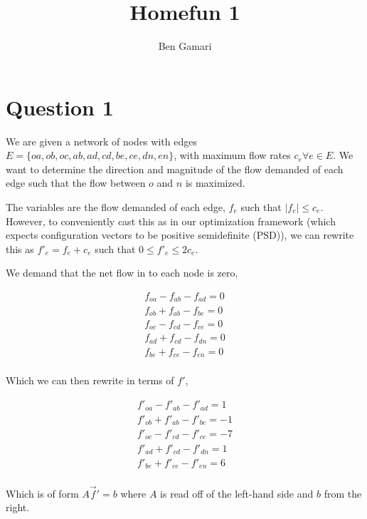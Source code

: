 \documentclass{article}
\title{Homefun 1}
\author{Ben Gamari}
\begin{document}
\maketitle

\section{Question 1}

We are given a network of nodes with edges $E = \{ oa, ob, oc, ab, ad, cd,
be, ce, dn, en \}$, with maximum flow rates $c_e \forall e \in E$. We want
to determine the direction and magnitude of the flow demanded of each
edge such that the flow between $o$ and $n$ is maximized.

The variables are the flow demanded of each edge, $f_e$ such that
$|f_e| \le c_e$. However, to conveniently cast this as in our
optimization framework (which expects configuration vectors to be
positive semidefinite (PSD)), we can rewrite this as $f'_e = f_e + c_e$ such
that $0 \le f'_e \le 2 c_e$.

We demand that the net flow in to each node is zero,

\begin{align*}
  f_{oa} - f_{ab} - f_{ad} = 0 \tag{node $a$} \\
  f_{ob} + f_{ab} - f_{be} = 0 \tag{node $b$} \\
  f_{oc} - f_{cd} - f_{ce} = 0 \tag{node $c$} \\
  f_{ad} + f_{cd} - f_{dn} = 0 \tag{node $d$} \\
  f_{be} + f_{ce} - f_{en} = 0 \tag{node $e$} \\
\end{align*}

Which we can then rewrite in terms of $f'$,

\begin{align*}
  f'_{oa} - f'_{ab} - f'_{ad} = 1  \tag{node $a$} \\
  f'_{ob} + f'_{ab} - f'_{be} = -1 \tag{node $b$} \\
  f'_{oc} - f'_{cd} - f'_{ce} = -7 \tag{node $c$} \\
  f'_{ad} + f'_{cd} - f'_{dn} = 1  \tag{node $d$} \\
  f'_{be} + f'_{ce} - f'_{en} = 6  \tag{node $e$} \\
\end{align*}

Which is of form $A \vec f' = b$ where $A$ is read off of the
left-hand side and $b$ from the right.
\end{document}
